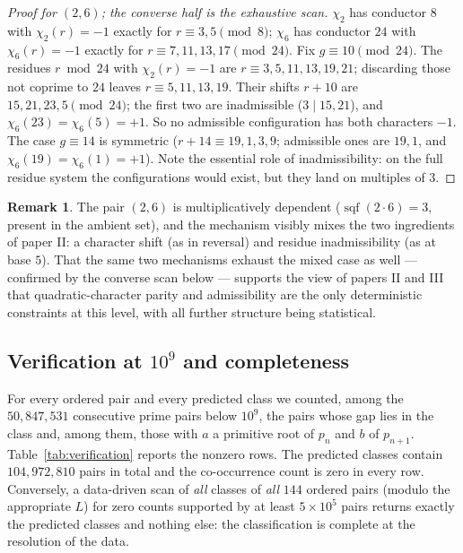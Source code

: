\documentclass[11pt,reqno]{amsart}
\theoremstyle{plain}
\theoremstyle{definition}
\newtheorem{remark}[theorem]{Remark}
\DeclareMathOperator{\sqf}{sqf}
\begin{document}
\begin{proof}[Proof for $(2,6)$; the converse half is the exhaustive scan]
$\chi_2$ has conductor $8$ with $\chi_2(r) = -1$ exactly for
$r \equiv 3, 5 \pmod 8$; $\chi_6$ has conductor $24$ with
$\chi_6(r) = -1$ exactly for $r \equiv 7, 11, 13, 17 \pmod{24}$. Fix
$g \equiv 10 \pmod{24}$. The residues $r \bmod 24$ with $\chi_2(r) = -1$ are
$r \equiv 3, 5, 11, 13, 19, 21$; discarding those not coprime to $24$ leaves
$r \equiv 5, 11, 13, 19$. Their shifts $r + 10$ are
$15, 21, 23, 5 \pmod{24}$; the first two are inadmissible ($3 \mid 15, 21$),
and $\chi_6(23) = \chi_6(5) = +1$. So no admissible configuration has both
characters $-1$. The case $g \equiv 14$ is symmetric ($r + 14 \equiv
19, 1, 3, 9$; admissible ones are $19, 1$, and $\chi_6(19) = \chi_6(1) =
+1$). Note the essential role of inadmissibility: on the full residue system
the configurations would exist, but they land on multiples of $3$.
\end{proof}

\begin{remark}
The pair $(2, 6)$ is multiplicatively dependent ($\sqf(2 \cdot 6) = 3$,
present in the ambient set), and the mechanism visibly mixes the two
ingredients of paper II: a character shift (as in reversal) and residue
inadmissibility (as at base $5$). That the same two mechanisms exhaust the
mixed case as well --- confirmed by the converse scan below --- supports the
view of papers II and III that quadratic-character parity and admissibility
are the only deterministic constraints at this level, with all further
structure being statistical.
\end{remark}

\subsection*{Verification at $10^9$ and completeness}
For every ordered pair and every predicted class we counted, among the
$50{,}847{,}531$ consecutive prime pairs below $10^9$, the pairs whose gap
lies in the class and, among them, those with $a$ a primitive root of $p_n$
and $b$ of $p_{n+1}$. Table~\ref{tab:verification} reports the nonzero rows.
The predicted classes contain $104{,}972{,}810$ pairs in total and the
co-occurrence count is zero in every row. Conversely, a data-driven scan of
\emph{all} classes of \emph{all} $144$ ordered pairs (modulo the appropriate
$L$) for zero counts supported by at least $5 \times 10^5$ pairs returns
exactly the predicted classes and nothing else: the classification is
complete at the resolution of the data.
\end{document}
